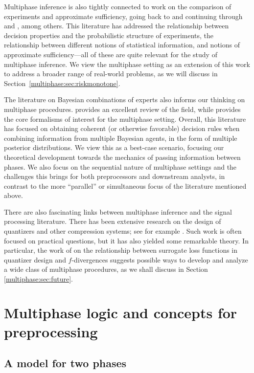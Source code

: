 Multiphase inference is also tightly connected to work on the comparison of experiments and approximate sufficiency, going back to \citet{Blackwell51,Blackwell53} and continuing through \citet{LeCam1964} and \citet{Goel79}, among others.
This literature has addressed the relationship between decision properties and the probabilistic structure of experiments, the relationship between different notions of statistical information, and notions of approximate sufficiency---all of these are quite relevant for the study of multiphase inference.
We view the multiphase setting as an extension of this work to address a broader range of real-world problems, as we will discuss in Section~\ref{multiphase:sec:riskmonotone}.

The literature on Bayesian combinations of experts also informs our thinking on multiphase procedures.
\citet{Kadane1993} provides an excellent review of the field, while \citet{Lindley1979} provides the core formalisms of interest for the multiphase setting.
Overall, this literature has focused on obtaining coherent (or otherwise favorable) decision rules when combining information from multiple Bayesian agents, in the form of multiple posterior distributions. We view this as a best-case scenario, focusing our theoretical development towards the mechanics of passing information between phases.
We also focus on the sequential nature of multiphase settings and the challenges this brings for both preprocessors and downstream analysts, in contrast to the more ``parallel'' or simultaneous focus of the literature mentioned above.

There are also fascinating links between multiphase inference and the signal processing literature.
There has been extensive research on the design of quantizers and other compression systems; see for example  \citet{Gray1998}.
Such work is often focused on practical questions, but it has also yielded some remarkable theory.
In particular, the work of \citet{Nguyen2009} on the relationship between surrogate loss functions in quantizer design and $f$-divergences suggests possible ways to develop and analyze a wide class of multiphase procedures, as we shall discuss  in Section \ref{multiphase:sec:future}.  

\section{Multiphase logic and concepts for preprocessing}
\label{multiphase:sec:concepts}

\subsection{A model for two phases}
\label{multiphase:sec:model}

